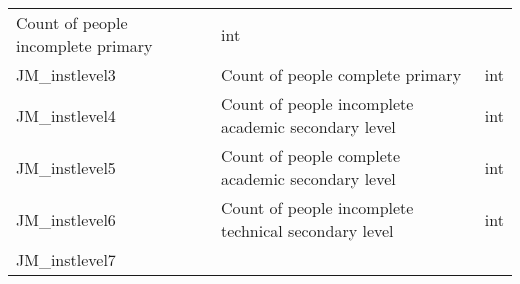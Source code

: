 \documentclass[11pt]{article}
\begin{document}
\begin{longtable}[]{@{}lll@{}}
\begin{minipage}[t]{0.12\columnwidth}
Count of people incomplete primary\strut
\end{minipage} & \begin{minipage}[t]{0.16\columnwidth}\raggedright\strut
int\strut
\end{minipage}\tabularnewline
\begin{minipage}[t]{0.63\columnwidth}\raggedright\strut
JM\_instlevel3\strut
\end{minipage} & \begin{minipage}[t]{0.12\columnwidth}\raggedright\strut
Count of people complete primary\strut
\end{minipage} & \begin{minipage}[t]{0.16\columnwidth}\raggedright\strut
int\strut
\end{minipage}\tabularnewline
\begin{minipage}[t]{0.63\columnwidth}\raggedright\strut
JM\_instlevel4\strut
\end{minipage} & \begin{minipage}[t]{0.12\columnwidth}\raggedright\strut
Count of people incomplete academic secondary level\strut
\end{minipage} & \begin{minipage}[t]{0.16\columnwidth}\raggedright\strut
int\strut
\end{minipage}\tabularnewline
\begin{minipage}[t]{0.63\columnwidth}\raggedright\strut
JM\_instlevel5\strut
\end{minipage} & \begin{minipage}[t]{0.12\columnwidth}\raggedright\strut
Count of people complete academic secondary level\strut
\end{minipage} & \begin{minipage}[t]{0.16\columnwidth}\raggedright\strut
int\strut
\end{minipage}\tabularnewline
\begin{minipage}[t]{0.63\columnwidth}\raggedright\strut
JM\_instlevel6\strut
\end{minipage} & \begin{minipage}[t]{0.12\columnwidth}\raggedright\strut
Count of people incomplete technical secondary level\strut
\end{minipage} & \begin{minipage}[t]{0.16\columnwidth}\raggedright\strut
int\strut
\end{minipage}\tabularnewline
\begin{minipage}[t]{0.63\columnwidth}\raggedright\strut
JM\_instlevel7\strut

\end{minipage}
\end{longtable}
\end{document}
